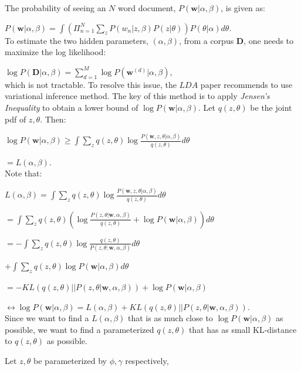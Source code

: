 \documentclass[conference,compsoc]{IEEEtran}
\begin{document}
  The probability of seeing an $N$ word document, $P(\textbf{w}|\alpha, \beta)$, is given as: 

  $P(\textbf{w}|\alpha, \beta) = \int(\Pi_{n=1}^N \sum_z P(w_n | z, \beta) P(z | \theta))  P(\theta | \alpha) d \theta$. \\

  To estimate the two hidden parameters, $(\alpha, \beta)$, from a corpus \textbf{D}, one needs to maximize the log likelihood: 

  $\log P(\textbf{D} | \alpha, \beta) = \sum_{d=1}^M \log P(\textbf{w}^{(d)} | \alpha, \beta)$, \\
  which is not tractable. To resolve this issue, the $LDA$ paper recommends to use variational inference method. The key of this method is to apply \emph{Jensen's Inequality} to obtain a lower bound of $\log P(\textbf{w} | \alpha, \beta)$. Let $q(z, \theta)$ be the joint pdf of $z, \theta$. Then: 

  $\log P(\textbf{w} | \alpha, \beta) \geq \int \sum_z q(z,\theta) \log \frac{P(\textbf{w}, z, \theta | \alpha, \beta)}{q(z, \theta)} d\theta$

  $ = L(\alpha, \beta)$. \\
  Note that: 

  $L(\alpha, \beta) = \int \sum_z q(z, \theta) \log \frac{P(\textbf{w}, z, \theta | \alpha, \beta)}{q(z, \theta)} d\theta$

  $ = \int \sum_z q(z, \theta) (\log \frac{P(z, \theta | \textbf{w}, \alpha, \beta)}{q(z, \theta)} + \log P(\textbf{w} | \alpha, \beta)) d\theta$

  $ = - \int \sum_z q(z, \theta) \log \frac{q(z,\theta)}{P(z, \theta; \textbf{w}, \alpha, \beta)} d \theta $ 

  $+ \int \sum_z q (z, \theta) \log P(\textbf{w} | \alpha, \beta) d \theta$

  $ = -KL(q(z,\theta) || P(z, \theta | \textbf{w}, \alpha, \beta)) + \log P(\textbf{w} | \alpha, \beta)$

  $ \leftrightarrow \log P(\textbf{w} | \alpha, \beta) = L(\alpha, \beta) + KL(q(z,\theta) || P(z, \theta | \textbf{w}, \alpha, \beta))$. \\
  Since we want to find a $L(\alpha, \beta)$ that is as much close to $\log P(\textbf{w} | \alpha, \beta)$ as possible, we want to find a parameterized $q(z, \theta)$ that has as small KL-distance to $q(z, \theta)$ as possible. 

  Let $z, \theta$ be parameterized by $\phi, \gamma$ respectively, 
\end{document}
